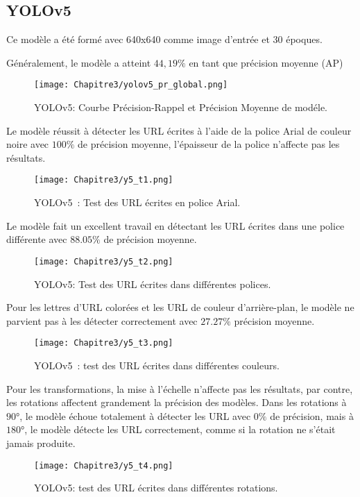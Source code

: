      \subsection{YOLOv5}
     Ce modèle a été formé avec 640x640 comme image d'entrée et 30 époques.
     
     Généralement, le modèle a atteint $44,19\%$ en tant que précision moyenne (AP)
     \begin{figure}[H]
               \centering
               \texttt{[image: Chapitre3/yolov5\_pr\_global.png]}
               \caption{YOLOv5: Courbe Précision-Rappel et Précision Moyenne de modéle.}
               \label{y4_pr}
               \end{figure}
     
     
     Le modèle réussit à détecter les URL écrites à l'aide de la police Arial de couleur noire avec $100\%$ de précision moyenne, l'épaisseur de la police n'affecte pas les résultats. 
     \begin{figure}[H]
               \centering
               \texttt{[image: Chapitre3/y5\_t1.png]}
               \caption{YOLOv5 : Test des URL écrites en police Arial.}
               \label{y5_t1}
               \end{figure}

     Le modèle fait un excellent travail en détectant les URL écrites dans une police différente avec $88.05\%$ de précision moyenne.
     \begin{figure}[H]
               \centering
               \texttt{[image: Chapitre3/y5\_t2.png]}
               \caption{YOLOv5: Test des URL écrites dans différentes polices.}
               \label{y5_t2}
               \end{figure}

     Pour les lettres d'URL colorées et les URL de couleur d'arrière-plan, le modèle ne parvient pas à les détecter correctement avec $27.27\%$ précision moyenne.
     \begin{figure}[H]
               \centering
               \texttt{[image: Chapitre3/y5\_t3.png]}
               \caption{YOLOv5 : test des URL écrites dans différentes couleurs.}
               \label{y5_t3}
               \end{figure}

     Pour les transformations, la mise à l'échelle n'affecte pas les résultats, par contre, les rotations affectent grandement la précision des modèles. Dans les rotations à $90 °$, le modèle échoue totalement à détecter les URL avec $0\%$ de précision, mais à $180 °$, le modèle détecte les URL correctement, comme si la rotation ne s'était jamais produite.
     \begin{figure}[H]
               \centering
               \texttt{[image: Chapitre3/y5\_t4.png]}
               \caption{YOLOv5: test des URL écrites dans différentes rotations.}
               \label{y5_t4}
               \end{figure}
     
